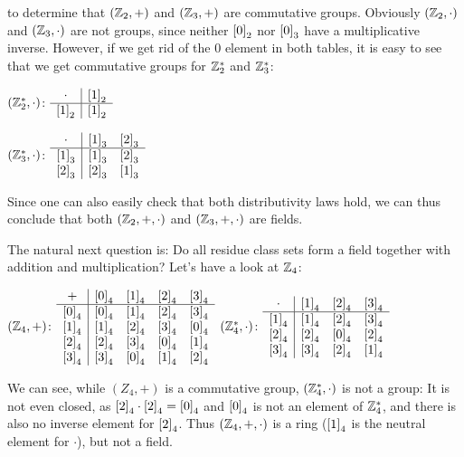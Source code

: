 to determine that $(\mathbb{Z}_2,+)$ and $(\mathbb{Z}_3,+)$ are commutative groups. Obviously
$(\mathbb{Z}_2,\cdot)$ and $(\mathbb{Z}_3,\cdot)$ are not groups, since neither ${{[0]}_{2}}$ nor
${{[0]}_{3}}$ have a multiplicative inverse. However, if we get rid of the $0$
element in both tables, it is easy to see that we get commutative groups for
$\mathbb{Z}_2^*$ and $\mathbb{Z}_3^*$:
\begin{center}
\begin{minipage}[t]{.3\textwidth}
  {$(\mathbb{Z}_2^*,\cdot)$:} $\begin{array}{c|c} \cdot &{{[1]}_{2}}\\\hline
    {{[1]}_{2}}&{{[1]}_{2}}\\
  \end{array}$
\end{minipage}
\begin{minipage}[t]{.3\textwidth}
  {$(\mathbb{Z}_3^*,\cdot)$:} $\begin{array}{c|cc} \cdot &{{[1]}_{3}}&{{[2]}_{3}}\\\hline
    {{[1]}_{3}}&{{[1]}_{3}}&{{[2]}_{3}}\\
    {{[2]}_{3}}&{{[2]}_{3}}&{{[1]}_{3}}\\
  \end{array}$
\end{minipage}
\end{center}
Since one can also easily check that both distributivity laws hold, we can thus
conclude that both $(\mathbb{Z}_2,+,\cdot)$ and $(\mathbb{Z}_3,+,\cdot)$ are fields.

The natural next question is: Do all residue class sets form a field together
with addition and multiplication? Let's have a look at $\mathbb{Z}_4$:

\begin{center}
  {$(\mathbb{Z}_4,+)$:} $\begin{array}{c|cccc} +
    &{{[0]}_{4}}&{{[1]}_{4}}&{{[2]}_{4}}&{{[3]}_{4}}\\\hline
    {{[0]}_{4}}&{{[0]}_{4}}&{{[1]}_{4}}&{{[2]}_{4}}&{{[3]}_{4}}\\
    {{[1]}_{4}}&{{[1]}_{4}}&{{[2]}_{4}}&{{[3]}_{4}}&{{[0]}_{4}}\\
    {{[2]}_{4}}&{{[2]}_{4}}&{{[3]}_{4}}&{{[0]}_{4}}&{{[1]}_{4}}\\
    {{[3]}_{4}}&{{[3]}_{4}}&{{[0]}_{4}}&{{[1]}_{4}}&{{[2]}_{4}}\\
  \end{array}$\qquad
  {$(\mathbb{Z}_4^*,\cdot)$:} $\begin{array}{c|ccc} \cdot
    &{{[1]}_{4}}&{{[2]}_{4}}&{{[3]}_{4}}\\\hline
    {{[1]}_{4}}&{{[1]}_{4}}&{{[2]}_{4}}&{{[3]}_{4}}\\
    {{[2]}_{4}}&{{[2]}_{4}}&{{[0]}_{4}}&{{[2]}_{4}}\\
    {{[3]}_{4}}&{{[3]}_{4}}&{{[2]}_{4}}&{{[1]}_{4}}\\
  \end{array}$
\end{center}
We can see, while $(Z_4,+)$ is a commutative group, $(\mathbb{Z}_4^*,\cdot)$ is not a
group: It is not even closed, as ${{[2]}_{4}}\cdot{{[2]}_{4}}={{[0]}_{4}}$ and
${{[0]}_{4}}$ is not an element of $\mathbb{Z}_4^*$, and there is also no inverse element
for ${{[2]}_{4}}$. Thus $(\mathbb{Z}_4,+,\cdot)$ is a ring (${{[1]}_{4}}$ is the neutral
element for $\cdot$), but not a field.

